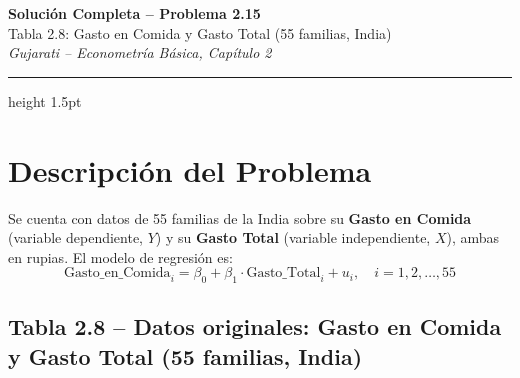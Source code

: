 \documentclass[12pt,a4paper]{article}
\begin{document}
\begin{center}
  {\LARGE \textbf{Solución Completa -- Problema 2.15}}\\[0.5em]
  {\large Tabla 2.8: Gasto en Comida y Gasto Total (55 familias, India)}\\[0.3em]
  {\normalsize \textit{Gujarati -- Econometría Básica, Capítulo 2}}
\end{center}
\hrule height 1.5pt
\vspace{1em}

\section{Descripción del Problema}

Se cuenta con datos de 55 familias de la India sobre su \textbf{Gasto en Comida}
(variable dependiente, $Y$) y su \textbf{Gasto Total} (variable independiente, $X$),
ambas en rupias. El modelo de regresión es:
\[
  \text{Gasto\_en\_Comida}_i = \beta_0 + \beta_1 \cdot \text{Gasto\_Total}_i + u_i,
  \quad i = 1, 2, \ldots, 55
\]

\subsection*{Tabla 2.8 -- Datos originales: Gasto en Comida y Gasto Total (55 familias, India)}
\end{document}

